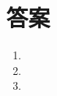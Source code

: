 \documentclass{jsarticle}
\newenvironment{problems}
{
  \renewcommand\labelenumi{\doublebox{\arabic{enumi}}}
  \begin{enumerate}
}{
  \end{enumerate}
  \renewcommand\labelenumi{\arabic{enumi}.}
}
\begin{document}
\section{答案}
\begin{problems}
\item 

\item 

\item 

\end{problems}
\end{document}
